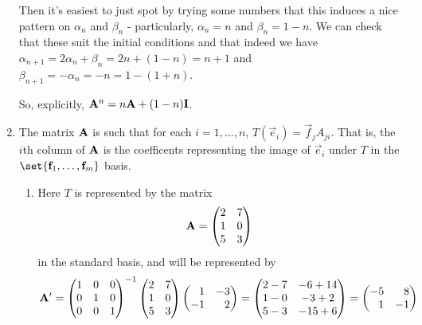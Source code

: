 \documentclass[fleqn,a4paper,11pt]{article}
\begin{document}
\begin{enumerate}[label=\textbf{\arabic*.}]
  Then it's easiest to just spot by trying some numbers that this induces a nice
  pattern on \(\alpha_n\) and \(\beta_n\) - particularly,
  \(\alpha_n = n\) and \(\beta_n = 1 - n\). We can check that these suit the
  initial conditions and that indeed we have
  \(\alpha_{n + 1} = 2\alpha_n + \beta_n = 2n + (1 - n) = n + 1\) and
  \(\beta_{n + 1} = -\alpha_n = -n = 1 - (1 + n)\).

  So, explicitly, \(\mathbf{A}^n = n\mathbf{A} + (1 - n)\mathbf{I}\).
 \item
  The matrix \(\mathbf{A}\) is such that for each \(i = 1, \dotsc, n\),
  \(T(\vec e_i) = \vec f_j A_{ji}\). That is, the \(i\)th column of \(\mathbf{A}\)
  is the coefficents representing the image of \(\vec e_i\) under \(T\) in the
  \(\set{\vec f_1, \dotsc, \vec f_m}\) basis.
  \begin{enumerate}[label=(\alph*)]
   \item
    Here \(T\) is represented by the matrix
    \begin{equation*}
     \mathbf{A} =
     \begin{pmatrix}
      2 & 7 \\
      1 & 0 \\
      5 & 3
     \end{pmatrix}
    \end{equation*}
    in the standard basis, and will be represented by
    \begin{equation*}
     \mat A' =
     \begin{pmatrix}
      1 & 0 & 0 \\
      0 & 1 & 0 \\
      0 & 0 & 1
     \end{pmatrix}^{-1}
     \begin{pmatrix}
      2 & 7 \\
      1 & 0 \\
      5 & 3
     \end{pmatrix}
     \begin{pmatrix*}[r]
      1 & -3 \\
      -1 & 2
     \end{pmatrix*}
     =
     \begin{pmatrix}
      2 - 7 & -6 + 14 \\
      1 - 0 & -3 + 2 \\
      5 - 3 & -15 + 6
     \end{pmatrix}
     =
     \begin{pmatrix*}[r]
      -5 & 8 \\
      1 & -1 \\

\end{pmatrix*}
\end{equation*}
\end{enumerate}
\end{enumerate}
\end{document}
